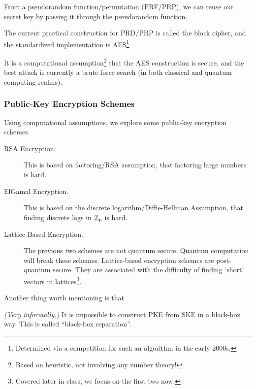 From a pseudorandom function/permutation (PRF/PRP), we can reuse our secret key by passing it through the pseudorandom function.

The current practical construction for PRD/PRP is called the block cipher, and the standardized implementation is AES\footnote{Determined via a competition for such an algorithm in the early 2000s. }

It is a computational assumption\footnote{Based on heuristic, not involving any number theory!} that the AES construction is secure, and the best attack is currently a brute-force search (in both classical and quantum computing realms).

\subsubsection{Public-Key Encryption Schemes}
Using computational assumptions, we explore some public-key encryption schemes.

\begin{description}
    \item[RSA Encryption.] This is based on factoring/RSA assumption, that factoring large numbers is hard.
    \item[ElGamal Encryption.] This is based on the discrete logarithm/Diffie-Hellman Assumption, that finding discrete logs in $\mathbb Z_p$ is hard.
    \item[Lattice-Based Encryption.] The previous two schemes are not quantum secure. Quantum computation will break these schemes. Lattice-based encryption schemes are post-quantum secure. They are associated with the difficulty of finding `short' vectors in lattices\footnote{Covered later in class, we focus on the first two now.}.
\end{description}

Another thing worth mentioning is that
\begin{theorem}
    \emph{(Very informally,)} It is impossible to construct PKE from SKE in a black-box way. This is called ``black-box separation''.
\end{theorem}

